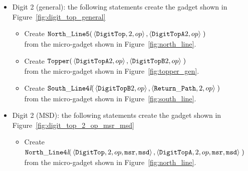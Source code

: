 \begin{itemize}
        \item Digit 2 (general): the following statements create the gadget shown in Figure~\ref{fig:digit_top_general}
        \begin{itemize}
            \item Create
            $\begin{aligned}[t]
                {\tt North\_Line5}(& \left\langle {\tt DigitTop}, 2, op \right\rangle,
                                     \left\langle {\tt DigitTopA} 2, op \right\rangle \;)
            \end{aligned}$\\from the micro-gadget shown in Figure~\ref{fig:north_line}.

            \item Create
            $\begin{aligned}[t]
                {\tt Topper}(& \left\langle {\tt DigitTopA} 2, op \right\rangle,
                               \left\langle {\tt DigitTopB} 2, op \right\rangle \;)
            \end{aligned}$\\from the micro-gadget shown in Figure~\ref{fig:topper_gen}.

            \item Create
            $\begin{aligned}[t]
                {\tt South\_Line4\textit{l}}(& \left\langle {\tt DigitTopB} 2, op \right\rangle,
                                               \left\langle {\tt Return\_Path},    2, op \right\rangle \;)
            \end{aligned}$\\from the micro-gadget shown in Figure~\ref{fig:south_line}.
        \end{itemize}
        \vspace{1cm}


        \item Digit 2 (MSD): the following statements create the gadget shown in Figure~\ref{fig:digit_top_2_op_msr_msd}
        \begin{itemize}
            \item Create
            $\begin{aligned}[t]
                {\tt North\_Line4\textit{l}}(& \left\langle {\tt DigitTop},  2, op, {\tt msr}, {\tt msd} \right\rangle,
                                               \left\langle {\tt DigitTopA}, 2, op, {\tt msr}, {\tt msd} \right\rangle\;)
            \end{aligned}$\\ from the micro-gadget shown in Figure~\ref{fig:north_line}.


\end{itemize}
\end{itemize}

